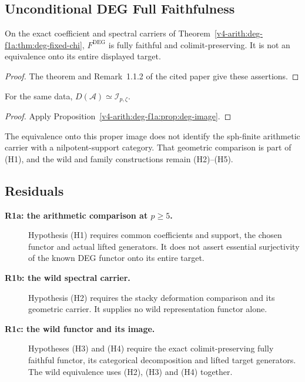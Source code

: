 \subsection{Unconditional DEG Full Faithfulness}

\begin{theorem}
\label{v4-arith:deg-f1a:thm:DEG-family-ff}
On the exact coefficient and spectral carriers of
Theorem~\ref{v4-arith:deg-f1a:thm:deg-fixed-chi},
\(F^{\mathrm{DEG}}\) is fully faithful and colimit-preserving.
It is not an equivalence onto its entire displayed target.
\end{theorem}
\begin{proof}
The theorem and Remark~1.1.2 of the cited paper give these assertions.
\end{proof}
\begin{corollary}
\label{v4-arith:deg-f1a:cor:partial-F1a-large-p}
For the same data,
\(D(\mathcal A)\simeq\mathcal I_{p,\zeta}\).
\end{corollary}
\begin{proof}
Apply Proposition~\ref{v4-arith:deg-f1a:prop:deg-image}.
\end{proof}
\begin{remark}
\label{v4-arith:deg-f1a:rem:strongest-uncond}
The equivalence onto this proper image does not identify the
sph-finite arithmetic carrier with a nilpotent-support category.
That geometric comparison is part of (H1), and the wild and family
constructions remain (H2)--(H5).
\end{remark}

\subsection{Residuals}

\begin{description}
\item[\textbf{R1a: the arithmetic comparison at \(p\geq5\).}]
Hypothesis (H1) requires common coefficients and support, the chosen
functor and actual lifted generators. It does not assert essential
surjectivity of the known DEG functor onto its entire target.
\item[\textbf{R1b: the wild spectral carrier.}]
Hypothesis (H2) requires the stacky deformation comparison and its
geometric carrier. It supplies no wild representation functor alone.
\item[\textbf{R1c: the wild functor and its image.}]
Hypotheses (H3) and (H4) require the exact colimit-preserving fully
faithful functor, its categorical decomposition and lifted target
generators. The wild equivalence uses (H2), (H3) and (H4) together.
\end{description}

